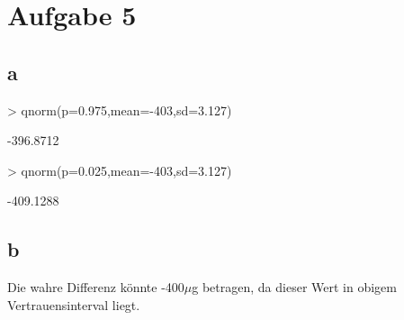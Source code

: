 

\section{Aufgabe 5}

\subsection{a}
\begin{Schunk}
\begin{Sinput}
> qnorm(p=0.975,mean=-403,sd=3.127)
\end{Sinput}
\begin{Soutput}
[1] -396.8712
\end{Soutput}
\begin{Sinput}
> qnorm(p=0.025,mean=-403,sd=3.127)
\end{Sinput}
\begin{Soutput}
[1] -409.1288
\end{Soutput}
\end{Schunk}

\subsection{b}
Die wahre Differenz könnte -400$\mu$g betragen, da dieser Wert in obigem 
Vertrauensinterval liegt. 
